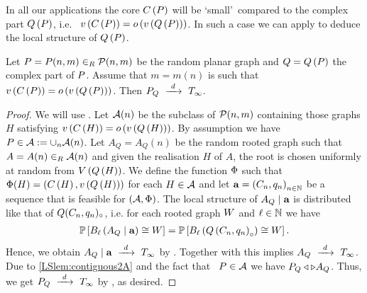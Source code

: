 In all our applications the core $C\left(P\right)$ will be \lq small\rq\ compared to the complex part $Q\left(P\right)$, i.e. \whp\ $v\left({C\left(P\right)}\right)=o\left(v\left({Q\left(P\right)}\right)\right)$. In such a case we can apply  to deduce the local structure of $Q\left(P\right)$.
\begin{lem}\label{LSlem:local_complex}
Let $P=P(n,m)\in_R\mathcal{P}(n,m)$ be the random planar graph and $Q=Q\left(P\right)$ the complex part of $P$. Assume that $m=m(n)$ is such that \whp\ $v\left({C\left(P\right)}\right)=o\left(v\left({Q\left(P\right)}\right)\right)$. Then $P_Q~\xrightarrow{~d~}~T_\infty$.
\end{lem}
\begin{proof}
We will use . Let $\mathcal{A}(n)$ be the subclass of $\mathcal{P}(n,m)$ containing those graphs $H$ satisfying $v\left({C\left(H\right)}\right)=o\left(v\left({Q\left(H\right)}\right)\right)$. By assumption we have \whp\ $P\in \mathcal{A}:=\cup_n\mathcal{A}(n)$. Let $A_Q=A_Q(n)$ be the random rooted graph such that $A=A(n)\in_R\mathcal{A}(n)$ and given the realisation $H$ of $A$, the root is chosen uniformly at random from $V\left(Q\left(H\right)\right)$. We define the function $\Phi$ such that $\Phi(H)=\left(C\left(H\right), v\left({Q\left(H\right)}\right)\right)$ for each $H\in\mathcal{A}$ and let $\mathbf{a}=\left(C_n, q_n\right)_{n\in\mathbb{N}}$ be a sequence that is feasible for $\left(\mathcal{A}, \Phi\right)$. The local structure of $A_Q \mid \mathbf{a}$ is distributed like that of $Q(C_n, q_n)_\circ$, i.e. for each rooted graph $W$ and $\ell\in\mathbb{N}$ we have
\begin{align*}
	\mathbb{P}\left[B_{\ell}\left(A_Q \mid \mathbf{a}\right)\cong W\right]=\mathbb{P}\left[B_{\ell}\left(Q\left(C_n, q_n\right)_\circ\right)\cong W\right].
\end{align*}
Hence, we obtain $A_Q \mid \mathbf{a}~\xrightarrow{~d~}~T_\infty$ by . Together with  this implies $A_Q~\xrightarrow{~d~}~T_\infty$. Due to \ref{LSlem:contiguous2A} and the fact that \whp\ $P\in \mathcal{A}$ we have $P_Q \triangleleft \triangleright A_Q$. Thus, we get $P_Q~\xrightarrow{~d~}~T_\infty$ by , as desired.
\end{proof}

